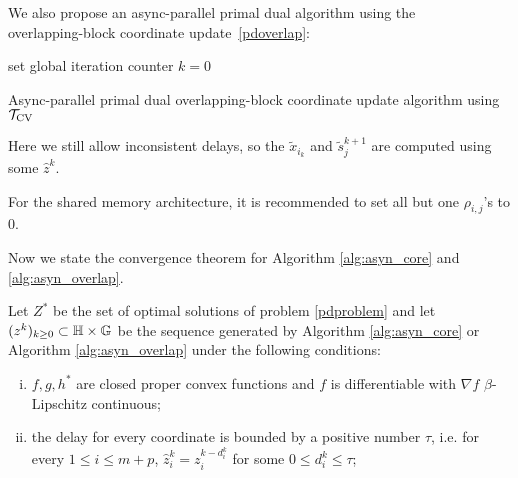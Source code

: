 {{{{We also propose an async-parallel primal dual algorithm using the \\overlapping-block coordinate update~\eqref{pdoverlap}:\\
\begin{algorithm}[H]\label{alg:asyn_overlap}
{}
 set global iteration
counter $k=0$\; 
 \caption{Async-parallel primal dual overlapping-block coordinate update algorithm using ${{\mathcal{T}}_{\textnormal{CV}}}$}
\end{algorithm}
Here we still allow inconsistent delays, so the $\tilde{x}_{i_k}$ and $\tilde{s}_j^{k+1}$ are computed using some $\hat{z}^k$.
\begin{remark}
For the shared memory architecture, it is recommended to set all but one $\rho_{i,j}$'s to $0$.
\end{remark}
Now we state the convergence theorem for Algorithm \ref{alg:asyn_core} and \ref{alg:asyn_overlap}.
\begin{thm}\label{thm:async-convergence}
Let $Z^*$ be the set of optimal solutions of problem \eqref{pdproblem} and let $(z^k)_{k\geq0}\subset \mathbb{H}\times\mathbb{G}$ be the sequence generated by Algorithm \ref{alg:asyn_core} or Algorithm \ref{alg:asyn_overlap} under the following conditions:
\begin{enumerate}[(i)]
\item $f,g,h^*$ are closed proper convex functions and $f$ is differentiable with $\nabla f$ $\beta$-Lipschitz continuous;
\item the delay for every coordinate is bounded by a positive number $\tau$, i.e. for every $1\leq i\leq m+p$, $\hat{z}^{k}_{i}=z_i^{k-d_{i}^k}$ for some $0\leq d_{i}^k\leq\tau$;

\end{enumerate}
\end{thm}}}}}
